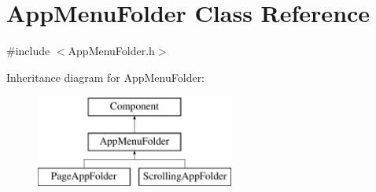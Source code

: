 \hypertarget{classAppMenuFolder}{}\section{App\+Menu\+Folder Class Reference}
\label{classAppMenuFolder}


{\ttfamily \#include $<$App\+Menu\+Folder.\+h$>$}

Inheritance diagram for App\+Menu\+Folder\+:\begin{figure}[H]
\begin{center}
\leavevmode
\includegraphics[height=3.000000cm]{classAppMenuFolder}
\end{center}
\end{figure}
